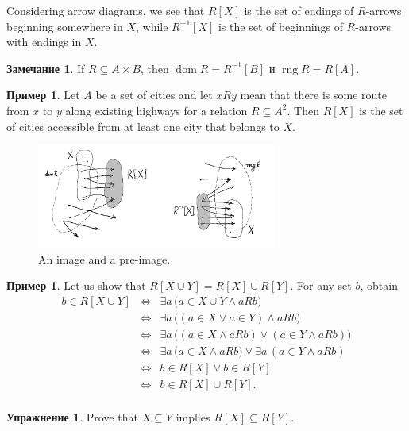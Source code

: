 \documentclass[12pt,notitlepage]{article}
\theoremstyle{plain}
\theoremstyle{definition}
\newtheorem{exc}[thm]{Упражнение}
\newtheorem{exm}[thm]{Пример}
\newtheorem{rem}[thm]{Замечание}
\theoremstyle{plain}
\newcommand{\sbs}{\subseteq}
\newcommand{\dom}{\mathop{\mathrm{dom}}}
\newcommand{\rng}{\mathop{\mathrm{rng}}}
\newcommand{\1}{\mathbf{1}}
\newcommand{\0}{\mathbf{0}}
\begin{document}
Considering arrow diagrams, we see that $R[X]$ is the set of endings of $R$-arrows beginning somewhere in $X$, while $R^{-1}[X]$ is the set of beginnings of $R$-arrows with endings in $X$.

\begin{rem}
	If $R \sbs A \times B$, then $\dom R = R^{-1}[B]$ и $\rng R = R[A]$.
\end{rem}

\begin{exm}
	Let $A$ be a set of cities and let $xRy$ mean that there is some route from $x$ to $y$ along existing highways for a relation $R \sbs A^2$. Then $R[X]$ is the set of cities accessible from at least one city that belongs to $X$.
\end{exm}

\begin{figure}[h]
	\centering
	\includegraphics*[width=0.7\textwidth]{rel_img.pdf}
	\caption{An image and a pre-image.}
\end{figure}

\begin{exm}
	Let us show that $R[X \cup Y] = R[X] \cup R[Y]$.
	For any set $b$, obtain
	$$
	\begin{array}{rcl}
		b \in R[X \cup Y] &\iff& \exists a\, \bigl(a \in X \cup Y \wedge a R b \bigr)\\
		&\iff& \exists a\, \bigl((a \in X \vee a \in Y) \wedge a R b \bigr)\\
		&\iff& \exists a\, \bigl((a \in X \wedge a R b) \vee (a \in Y \wedge a R b)\bigr)\\
		&\iff& \exists a\, \bigl(a \in X \wedge a R b) \vee \exists a\, (a \in Y \wedge a R b)\\
		&\iff& b \in R[X] \vee b \in R[Y]\\
		&\iff& b \in R[X] \cup R[Y].\\
	\end{array}
	$$
\end{exm}

\begin{exc}\label{ch0:img_monot}
	Prove that $X \sbs Y$ implies $R[X] \sbs R[Y]$.
\end{exc}
\end{document}
